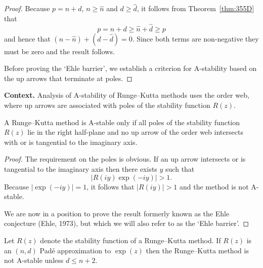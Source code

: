 \begin{proof}
Because \( p = n + d \), \( n \geq \widehat{n} \) and \( d \geq \widehat{d} \), it follows from Theorem~\ref{thm:355D} that
\[
p = n + d \geq \widehat{n} + \widehat{d} \geq p
\]
and hence that \( (n - \widehat{n}) + (d - \widehat{d}) = 0 \). Since both terms are non-negative they must be zero and the result follows.

Before proving the `Ehle barrier', we establish a criterion for A-stability based on the up arrows that terminate at poles.
\end{proof}

\noindent\textbf{Context.}
Analysis of A-stability of Runge--Kutta methods uses the order web, where up arrows are associated with poles of the stability function $R(z)$.

\begin{theorem}

  \label{thm:355F}
A Runge--Kutta method is A-stable only if all poles of the stability function $R(z)$ lie in the right half-plane and no up arrow of the order web intersects with or is tangential to the imaginary axis.
\end{theorem}

\begin{proof}
The requirement on the poles is obvious. If an up arrow intersects or is tangential to the imaginary axis then there exists $y$ such that
\[
|R(iy) \exp(-iy)| > 1.
\]
Because $|\exp(-iy)| = 1$, it follows that $|R(iy)| > 1$ and the method is not A-stable.

We are now in a position to prove the result formerly known as the Ehle conjecture (Ehle, 1973), but which we will also refer to as the `Ehle barrier'.
\end{proof}

\begin{theorem}

  \label{thm:355G}
Let \( R(z) \) denote the stability function of a Runge--Kutta method. If \( R(z) \) is an \( (n, d) \) Pad\'e approximation to \( \exp(z) \) then the Runge--Kutta method is not A-stable unless \( d \leq n + 2 \).
\end{theorem}

